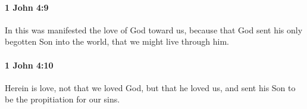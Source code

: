 		\paragraph{1 John 4:9} %
			\label{1JOHN-4-9}

			In this was manifested the love of God toward us, because that God sent his only begotten Son into the world, that we might live through him.

			\begin{framed}
			\scriptsize
				\begin{compactdesc}
					\item[SBLG] 
				\end{compactdesc}
			\end{framed}

		\paragraph{1 John 4:10} %
			\label{1JOHN-4-10}

			Herein is love, not that we loved God, but that he loved us, and sent his Son to be the propitiation for our sins.

